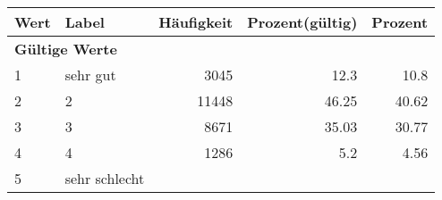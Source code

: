      \begin{longtable}{lXrrr}
     \toprule
     \textbf{Wert} & \textbf{Label} & \textbf{Häufigkeit} & \textbf{Prozent(gültig)} & \textbf{Prozent} \\
     \endhead
     \midrule
     \multicolumn{5}{l}{\textbf{Gültige Werte}}\\

     1 &
     \multicolumn{1}{X}{ sehr gut   } &


       \num{3045} &
       \num[round-mode=places,round-precision=2]{12,3} &
         \num[round-mode=places,round-precision=2]{10,8} \\

     2 &
     \multicolumn{1}{X}{ 2   } &


       \num{11448} &
       \num[round-mode=places,round-precision=2]{46,25} &
         \num[round-mode=places,round-precision=2]{40,62} \\

     3 &
     \multicolumn{1}{X}{ 3   } &


       \num{8671} &
       \num[round-mode=places,round-precision=2]{35,03} &
         \num[round-mode=places,round-precision=2]{30,77} \\

     4 &
     \multicolumn{1}{X}{ 4   } &


       \num{1286} &
       \num[round-mode=places,round-precision=2]{5,2} &
         \num[round-mode=places,round-precision=2]{4,56} \\

     5 &
     \multicolumn{1}{X}{ sehr schlecht   } &



\end{longtable}
